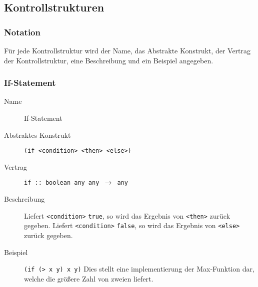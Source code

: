 \documentclass[a4paper, 11pt, accentcolor = tud3b]{tudreport}
\begin{document}
        \subsection{Kontrollstrukturen}
            \subsubsection{Notation}
                Für jede Kontrollstruktur wird der Name, das Abstrakte Konstrukt, der Vertrag der Kontrollstruktur, eine Beschreibung und ein Beispiel angegeben.


            \subsubsection{If-Statement}
                \label{racket:if}
                \begin{description}
                    \item[Name] If-Statement
                    \item[Abstraktes Konstrukt] \texttt{(if <condition> <then> <else>)}
                    \item[Vertrag] \texttt{if :: boolean any any $ \rightarrow $ any}
                    \item[Beschreibung] Liefert \texttt{<condition>} \texttt{true}, so wird das Ergebnis von \texttt{<then>} zurück gegeben. Liefert \texttt{<condition>} \texttt{false}, so wird das Ergebnis von \texttt{<else>} zurück gegeben.
                    \item[Beispiel] \texttt{(if (> x y) x y)} Dies stellt eine implementierung der Max-Funktion dar, welche die größere Zahl von zweien liefert.
                \end{description}
\end{document}
